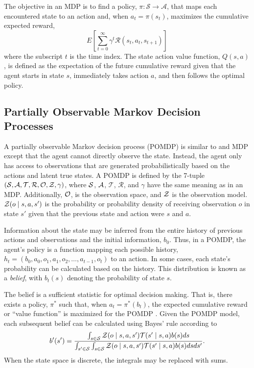 The objective in an MDP is to find a policy, $\pi: \mathcal{S} \to \mathcal{A}$, that maps each encountered state to an action and, when $a_t = \pi(s_t)$, maximizes the cumulative expected reward,
\begin{equation} \label{eq:cumulative}
    E\left[\sum_{t=0}^\infty \gamma^t \mathcal{R}(s_t, a_t, s_{t+1}) \right]
\end{equation}
where the subscript $t$ is the time index. The state action value function, $Q(s,a)$, is defined as the expectation of the future cumulative reward given that the agent starts in state $s$, immediately takes action $a$, and then follows the optimal policy.

\subsection{Partially Observable Markov Decision Processes}

A partially observable Markov decision process (POMDP) is similar to and MDP except that the agent cannot directly observe the state.
Instead, the agent only has access to observations that are generated probabilistically based on the actions and latent true states.
A POMDP is defined by the 7-tuple $(\mathcal{S}, \mathcal{A}, \mathcal{T}, \mathcal{R}, \mathcal{O}, \mathcal{Z}, \gamma)$, where $\mathcal{S}$, $\mathcal{A}$, $\mathcal{T}$, $\mathcal{R}$, and $\gamma$ have the same meaning as in an MDP.
Additionally, $\mathcal{O}$, is the observation space, and $\mathcal{Z}$ is the observation model.
$\mathcal{Z}(o \mid s, a, s')$ is the probability or probability density of receiving observation $o$ in state $s'$ given that the previous state and action were $s$ and $a$.

Information about the state may be inferred from the entire history of previous actions and observations and the initial information, $b_0$.
Thus, in a POMDP, the agent's policy is a function mapping each possible history, $h_t = (b_0, a_0, o_1, a_1, o_2, \dots, a_{t-1}, o_t)$ to an action.
In some cases, each state's probability can be calculated based on the history.
This distribution is known as a \emph{belief}, with $b_t(s)$ denoting the probability of state $s$.

The belief is a sufficient statistic for optimal decision making.
That is, there exists a policy, $\pi^*$ such that, when $a_t = \pi^*(b_t)$, the expected cumulative reward or ``value function'' is maximized for the POMDP \cite{kaelbling1998planning,kochenderfer2015decision}.
Given the POMDP model, each subsequent belief can be calculated using Bayes' rule according to
\begin{equation} \label{eqn:update}
    b'(s') = \frac{\int_{s\in\mathcal{S}} \mathcal{Z}(o \mid s, a, s') \mathcal{T}(s' \mid s, a) b(s) ds}
    {\int_{s'\in\mathcal{S}} \int_{s\in\mathcal{S}} \mathcal{Z}(o \mid s, a, s') \mathcal{T}(s' \mid s, a) b(s) ds ds'} \text{.}
\end{equation}
When the state space is discrete, the integrals may be replaced with sums.

